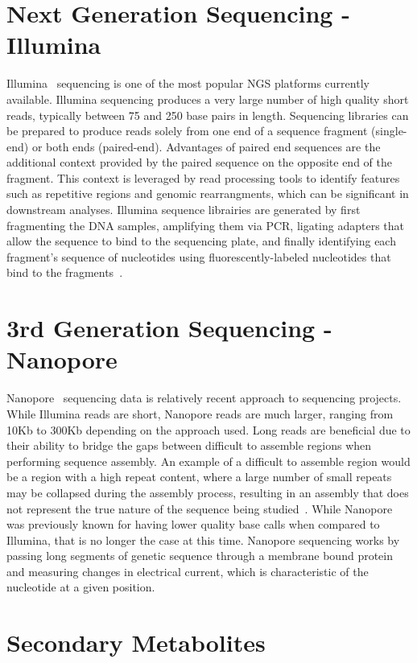 \section{Next Generation Sequencing - Illumina}
Illumina\texttrademark ~\cite{Bennett2004} sequencing is one of the
most popular NGS platforms currently available. Illumina sequencing
produces a very large number of high quality short reads, typically
between 75 and 250 base pairs in length. Sequencing libraries can be
prepared to produce reads solely from one end of a sequence fragment
(single-end) or both ends (paired-end). Advantages of paired end
sequences are the additional context provided by the paired sequence
on the opposite end of the fragment. This context is leveraged by read
processing tools to identify features such as repetitive regions and
genomic rearrangments, which can be significant in downstream
analyses. Illumina sequence librairies are generated by first
fragmenting the DNA samples, amplifying them via PCR, ligating
adapters that allow the sequence to bind to the sequencing plate, and
finally identifying each fragment's sequence of nucleotides using
fluorescently-labeled nucleotides that bind to the
fragments~\cite{Goodwin2016}.

\section{3rd Generation Sequencing - Nanopore}

Nanopore\texttrademark ~\cite{Wang2021} sequencing data is relatively
recent approach to sequencing projects. While Illumina reads are
short, Nanopore reads are much larger, ranging from 10Kb to 300Kb
depending on the approach used. Long reads are beneficial due to their
ability to bridge the gaps between difficult to assemble regions when
performing sequence assembly. An example of a difficult to assemble
region would be a region with a high repeat content, where a large
number of small repeats may be collapsed during the assembly process,
resulting in an assembly that does not represent the true nature of
the sequence being studied~\cite{Marx2023}. While Nanopore was
previously known for having lower quality base calls when compared to
Illumina, that is no longer the case at this time. Nanopore sequencing
works by passing long segments of genetic sequence through a membrane
bound protein and measuring changes in electrical current, which is
characteristic of the nucleotide at a given position.

\section{Secondary Metabolites}

